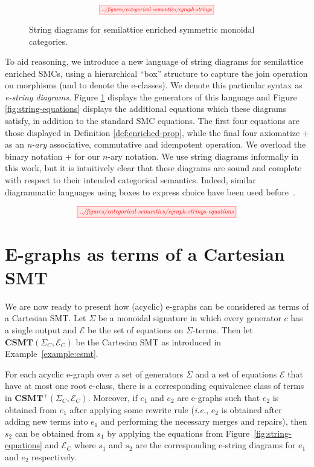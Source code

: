 \documentclass[sigconf, 9pt, nonacm]{acmart}
\begin{document}
\begin{figure}
    \[
        \scalebox{0.65}{
        \tikzfig{../figures/categorical-semantics/egraph-strings}
        }
    \]
    \captionsetup{belowskip=-5ex}
    \caption{String diagrams for semilattice enriched symmetric monoidal categories.}
    \label{fig:egraph-strings}
    \end{figure}
    

To aid reasoning, we introduce a new language of string diagrams for semilattice enriched SMCs, using a hierarchical ``box'' structure to capture the join operation on morphisms (and to denote the e-classes).
We denote this particular syntax as \textit{e-string diagrams}.
Figure \ref{fig:egraph-strings} displays the generators of this language and Figure \ref{fig:string-equations} displays the additional equations which these diagrams satisfy, in addition to the standard SMC equations. 
The first four equations are those displayed in Definition \ref{def:enriched-prop},  while the final four axiomatize $+$ as an \textit{n-ary} associative, commutative and idempotent operation.  We overload the binary notation $+$ for our $n$-ary notation.  
We use string diagrams informally in this work, but it is intuitively clear that these diagrams are sound and complete with respect to their intended categorical semantics. 
Indeed, similar diagrammatic languages using boxes to express choice have been used before~\cite{duncan_generalised_2009}. 

\begin{figure*}
\[  
    \scalebox{0.75}{
	\tikzfig{../figures/categorical-semantics/egraph-strings-equations}
    }
\]
\caption{Equations for a  semilattice enriched symmetric monoidal category}
\label{fig:string-equations}
\end{figure*}

\section{E-graphs as terms of a Cartesian SMT}
We are now ready to present how (acyclic) e-graphs can be considered as terms of a Cartesian SMT.
Let $\Sigma$ be a monoidal signature in which every generator $c$ has a single output and $\mathcal{E}$ be the set of equations on $\Sigma$-terms. 
Then let $\textbf{CSMT}(\Sigma_{C},\mathcal{E}_{C})$ be the Cartesian SMT as introduced in Example~\ref{example:csmt}.
\begin{proposition}
    For each acyclic e-graph over a set of generators $\Sigma$ and a set of equations $\mathcal{E}$ that have at most one root e-class, there is a corresponding equivalence class of terms in $\textbf{CSMT}^{+}(\Sigma_{C},\mathcal{E}_{C})$.
    Moreover, if $e_1$ and $e_2$ are e-graphs such that $e_2$ is obtained from $e_1$ after applying some rewrite rule (\textit{i.e.}, $e_2$ is obtained after adding new terms into $e_1$ and performing the necessary merges and repairs), then $s_2$ can be obtained from $s_1$ by applying the equations from Figure~\ref{fig:string-equations} and $\mathcal{E}_{C}$ where $s_1$ and $s_2$ are the corresponding e-string diagrams for $e_1$ and $e_2$ respectively.
\end{proposition}
\end{document}
